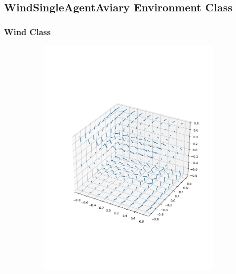 \subsection{WindSingleAgentAviary Environment Class}

\newpage

\subsubsection{Wind Class}
\begin{figure}
	\centering
	\begin{subfigure}{0.32\linewidth}
		\includegraphics[width=\linewidth]{figures/wind4.png}
		\caption{}
		\label{eq:wind5}
	\end{subfigure}
	\begin{subfigure}{0.32\linewidth}

\end{subfigure}
\end{figure}
